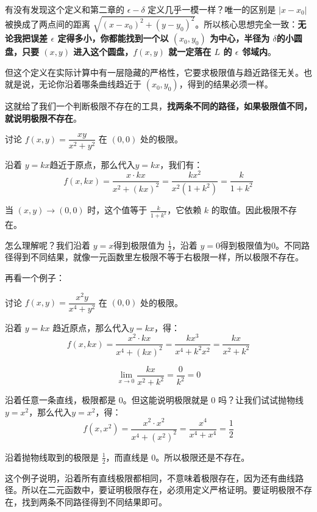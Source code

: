 有没有发现这个定义和第二章的 $\epsilon-\delta$ 定义几乎一模一样？唯一的区别是 $|x - x_0|$ 被换成了两点间的距离 $\sqrt{(x - x_0)^2 + (y - y_0)^2}$。所以核心思想完全一致：\textbf{无论我把误差 $\epsilon$ 定得多小，你都能找到一个以 $(x_0, y_0)$ 为中心，半径为 $\delta$的小圆盘，只要 $(x, y)$ 进入这个圆盘，$f(x, y)$ 就一定落在 $L$ 的 $\epsilon$ 邻域内}。

但这个定义在实际计算中有一层隐藏的严格性，它要求极限值与趋近路径无关。也就是说，无论你沿着哪条曲线趋近于 $(x_0, y_0)$，得到的结果必须一样。

这就给了我们一个判断极限不存在的工具，\textbf{找两条不同的路径，如果极限值不同，就说明极限不存在}。

\begin{myexample}
  讨论 $f(x, y) = \dfrac{xy}{x^2 + y^2}$ 在 $(0, 0)$ 处的极限。

  沿着 $y = kx$趋近于原点，那么代入$y = kx$，我们有：
  \[
  f(x, kx) = \frac{x \cdot kx}{x^2 + (kx)^2} = \frac{kx^2}{x^2(1 + k^2)} = \frac{k}{1 + k^2}
  \]

  当 $(x, y) \to (0, 0)$ 时，这个值等于 $\frac{k}{1+k^2}$，它依赖 $k$ 的取值。因此极限不存在。
\end{myexample}

怎么理解呢？我们沿着 $y = x$得到极限值为 $\frac{1}{2}$，沿着 $y = 0$得到极限值为$0$。不同路径得到不同结果，就像一元函数里左极限不等于右极限一样，所以极限不存在。

再看一个例子：

\begin{myexample}
  讨论 $f(x, y) = \dfrac{x^2 y}{x^4 + y^2}$ 在 $(0, 0)$ 处的极限。

  沿着 $y = kx$ 趋近原点，那么代入$y = kx$，得：
  \[
  f(x, kx) = \frac{x^2 \cdot kx}{x^4 + (kx)^2} = \frac{kx^3}{x^4 + k^2 x^2} = \frac{kx}{x^2 + k^2}
  \]

  \[\lim_{x \to 0} \frac{kx}{x^2 + k^2} = \frac{0}{k^2} = 0\]

  沿着任意一条直线，极限都是 $0$。但这能说明极限就是 $0$ 吗？让我们试试抛物线 $y = x^2$，那么代入$y = x^2$，得：
  \[
  f(x, x^2) = \frac{x^2 \cdot x^2}{x^4 + (x^2)^2} = \frac{x^4}{x^4 + x^4} = \frac{1}{2}
  \]

  沿着抛物线取到的极限是 $\frac{1}{2}$，而直线是 $0$。所以极限还是不存在。
\end{myexample}

这个例子说明，沿着所有直线极限都相同，不意味着极限存在，因为还有曲线路径。所以在二元函数中，要证明极限存在，必须用定义严格证明。要证明极限不存在，找到两条不同路径得到不同结果即可。

